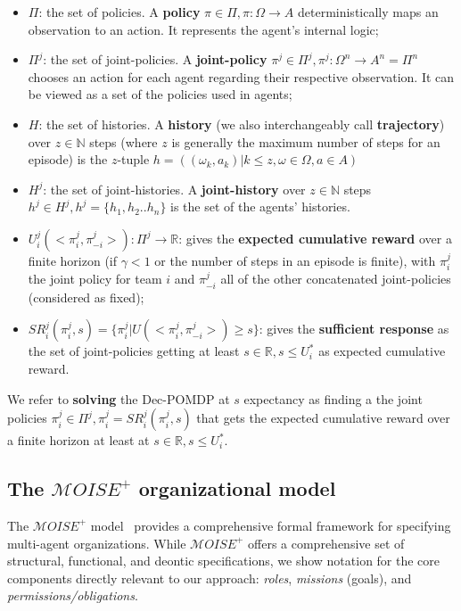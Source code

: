 \documentclass[pdflatex,sn-mathphys-num]{sn-jnl}%
\theoremstyle{thmstyleone}%
\theoremstyle{thmstyletwo}%
\theoremstyle{thmstylethree}%
\begin{document}
\begin{itemize}

    \item $\Pi$: the set of policies. A \textbf{policy} $\pi \in \Pi, \pi: \Omega \rightarrow A$ deterministically maps an observation to an action. It represents the agent's internal logic;
    \item $\Pi^{j}$: the set of joint-policies. A \textbf{joint-policy} $\pi^{j} \in \Pi^{j}, \pi^{j}: \Omega^n \rightarrow A^n = \Pi^n$ chooses an action for each agent regarding their respective observation. It can be viewed as a set of the policies used in agents;
    \item $H$: the set of histories. A \textbf{history} (we also interchangeably call \textbf{trajectory}) over $z \in \mathbb{N}$ steps (where $z$ is generally the maximum number of steps for an episode) is the $z$-tuple $h = ((\omega_{k}, a_{k}) | k \leq z, \omega \in \Omega, a \in A)$
    \item $H^{j}$: the set of joint-histories. A \textbf{joint-history} over $z \in \mathbb{N}$ steps $h^{j} \in H^{j}, h^{j} = \{h_1,h_2..h_n\}$ is the set of the agents' histories.
    \item $U^{j}_{i}(<\pi^{j}_{i}, \pi^{j}_{-i}>): \Pi^{j} \rightarrow \mathbb{R}$: gives the \textbf{expected cumulative reward} over a finite horizon (if $\gamma < 1$ or the number of steps in an episode is finite), with $\pi^{j}_{i}$ the joint policy for team $i$ and $\pi^{j}_{-i}$ all of the other concatenated joint-policies (considered as fixed);
    \item $SR^{j}_{i}(\pi^{j}_{i}, s) = \{\pi^{j}_{i} | U(<\pi^{j}_{i},\pi^{j}_{-i}>) \geq s\}$: gives the \textbf{sufficient response} as the set of joint-policies getting at least $s \in \mathbb{R}, s \leq U_i^*$ as expected cumulative reward.
\end{itemize}

\noindent We refer to \textbf{solving} the Dec-POMDP at $s$ expectancy as finding a the joint policies $\pi^{j}_{i} \in \Pi^{j}, \pi^{j}_{i} = SR^{j}_{i}(\pi^{j}_{i}, s)$ that gets the expected cumulative reward over a finite horizon at least at $s \in \mathbb{R}, s \leq U_i^*$.


\subsection{The $\mathcal{M}OISE^+$ organizational model}

The $\mathcal{M}OISE^+$ model~\cite{Hubner2002, Hubner2007} provides a comprehensive formal framework for specifying multi-agent organizations. While $\mathcal{M}OISE^+$ offers a comprehensive set of structural, functional, and deontic specifications, we show notation for the core components directly relevant to our approach: \textit{roles}, \textit{missions} (goals), and \textit{permissions/obligations}.
\end{document}
